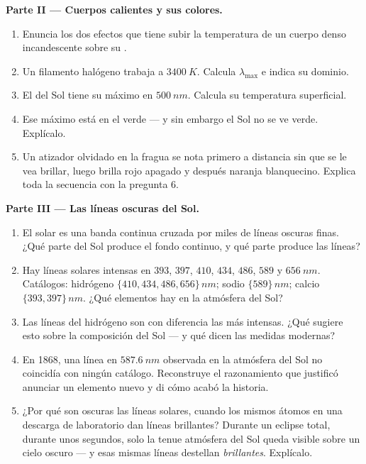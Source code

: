 \begin{problem}
\medskip
\noindent\textbf{Parte II --- Cuerpos calientes y sus colores.}
\begin{enumerate}[resume]
  \item Enuncia los dos efectos que tiene subir la temperatura de un
        cuerpo denso incandescente sobre su .
  \item Un filamento halógeno trabaja a $\qty{3400}{K}$. Calcula
        $\lambda_{\max}$ e indica su dominio.
  \item El  del Sol tiene su máximo en $\qty{500}{nm}$.
        Calcula su temperatura superficial.
  \item Ese máximo está en el verde --- y sin embargo el Sol no se ve
        verde. Explícalo.
  \item Un atizador olvidado en la fragua se nota primero a distancia
        sin que se le vea brillar, luego brilla rojo apagado y después
        naranja blanquecino. Explica toda la secuencia con la pregunta
        6.
\end{enumerate}

\medskip
\noindent\textbf{Parte III --- Las líneas oscuras del Sol.}
\begin{enumerate}[resume]
  \item El  solar es una banda continua cruzada por miles de
        líneas oscuras finas. ¿Qué parte del Sol produce el fondo
        continuo, y qué parte produce las líneas?
  \item Hay líneas solares intensas en $393$, $397$, $410$, $434$,
        $486$, $589$ y $\qty{656}{nm}$. Catálogos: hidrógeno
        $\{410, 434, 486, 656\}\,\unit{nm}$; sodio $\{589\}\,\unit{nm}$;
        calcio $\{393, 397\}\,\unit{nm}$. ¿Qué elementos hay en la
        atmósfera del Sol?
  \item Las líneas del hidrógeno son con diferencia las más intensas.
        ¿Qué sugiere esto sobre la composición del Sol --- y qué dicen
        las medidas modernas?
  \item En 1868, una línea en $\qty{587.6}{nm}$ observada en la
        atmósfera del Sol no coincidía con ningún catálogo. Reconstruye
        el razonamiento que justificó anunciar un elemento nuevo y di
        cómo acabó la historia.
  \item ¿Por qué son oscuras las líneas solares, cuando los mismos
        átomos en una descarga de laboratorio dan líneas brillantes?
        Durante un eclipse total, durante unos segundos, solo la tenue
        atmósfera del Sol queda visible sobre un cielo oscuro --- y esas
        mismas líneas destellan \emph{brillantes}. Explícalo.
\end{enumerate}


\end{problem}
